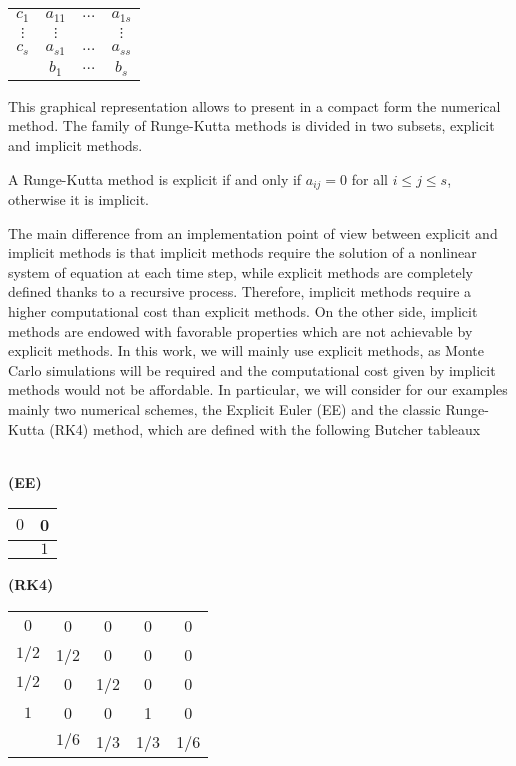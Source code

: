 \begin{center}
	\begin{tabular}{c|ccc}
		$c_1$ & $a_{11}$ & $\ldots$ & $a_{1s}$\\
		$\vdots$ & $\vdots$ & & $\vdots$ \\
		$c_s$ & $a_{s1}$ & $\ldots$ & $a_{ss}$\\
		\hline 
		&$b_1$ & $\ldots$ & $b_s$
	\end{tabular}
\end{center}
This graphical representation allows to present in a compact form the numerical method. The family of Runge-Kutta methods is divided in two subsets, explicit and implicit methods.
\begin{definition} A Runge-Kutta method is explicit if and only if $a_{ij} = 0$ for all $i \leq j \leq s$, otherwise it is implicit. 
\end{definition}
\noindent The main difference from an implementation point of view between explicit and implicit methods is that implicit methods require the solution of a nonlinear system of equation at each time step, while explicit methods are completely defined thanks to a recursive process. Therefore, implicit methods require a higher computational cost than explicit methods. On the other side, implicit methods are endowed with favorable properties which are not achievable by explicit methods. In this work, we will mainly use explicit methods, as Monte Carlo simulations will be required and the computational cost given by implicit methods would not be affordable. In particular, we will consider for our examples mainly two numerical schemes, the Explicit Euler (EE) and the classic Runge-Kutta (RK4) method, which are defined with the following Butcher tableaux \\ \\
\begin{minipage}{0.5\linewidth} 
	\begin{center}
		\textbf{(EE)}
		\begin{tabular}{c|c}
			$0$ & 0 \\
			\hline 
			&$1$ 
		\end{tabular}
	\end{center}
\end{minipage}
\begin{minipage}{0.5\linewidth} 
	\begin{center}
		\textbf{(RK4)}
		\begin{tabular}{c|cccc}
			$0$ & 0 & 0 & 0 & 0\\
			$1/2$ & 1/2 & 0 & 0 & 0\\
			$1/2$ & 0 & 1/2 & 0 & 0\\
			$1$ & 0 & 0 & 1 & 0\\
			\hline 
			&$1/6$ & 1/3 & 1/3 & 1/6
		\end{tabular}
	\end{center}
\end{minipage} \\ \\
